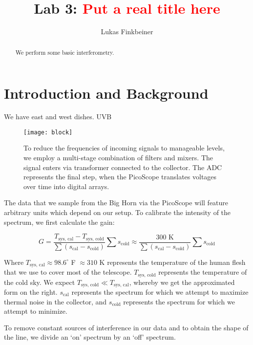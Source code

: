 \documentclass[12pt]{article}
\title{Lab 3: \textcolor{red}{Put a real title here}}
\author{Lukas Finkbeiner}
\begin{document}
\maketitle

\begin{abstract}

We perform some basic interferometry.

\end{abstract}

\section{Introduction and Background}

We have east and west dishes. UVB

\begin{figure}
\centering
	\texttt{[image: block]}
	\caption{To reduce the frequencies of incoming signals to manageable levels, we employ a multi-stage combination of filters and mixers. The signal enters via transformer connected to the collector. The ADC represents the final step, when the PicoScope translates voltages over time into digital arrays.}
	\label{fig:block}
\end{figure}

The data that we sample from the Big Horn via the PicoScope will feature arbitrary units which depend on our setup. To calibrate the intensity of the spectrum, we first calculate the gain:

\begin{equation} \label{eq:thermal}
G = \frac{T_\text{sys, cal} - T_\text{sys, cold}}{\sum (s_\text{cal} - s_\text{cold})} \sum s_\text{cold} \approx \frac{\text{300 K}}{\sum (s_\text{cal} - s_\text{cold})} \sum s_\text{cold}
\end{equation}

Where $T_\text{sys, cal} \approx 98.6^\circ$ F $\approx 310$ K represents the temperature of the human flesh that we use to cover most of the telescope. $T_\text{sys, cold}$ represents the temperature of the cold sky. We expect $T_\text{sys, cold} \ll T_\text{sys, cal}$, whereby we get the approximated form on the right. $s_\text{cal}$ represents the spectrum for which we attempt to maximize thermal noise in the collector, and $s_\text{cold}$ represents the spectrum for which we attempt to minimize.

To remove constant sources of interference in our data and to obtain the shape of the line, we divide an `on' spectrum by an `off' spectrum. 
\end{document}
